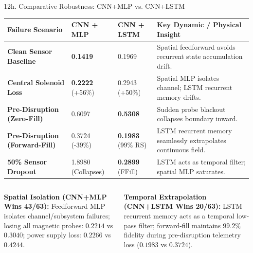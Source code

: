 \documentclass[aspectratio=169, 10pt]{beamer}
\begin{document}
\begin{frame}{12h. Comparative Robustness: CNN+MLP vs. CNN+LSTM}
  \vspace{-4pt}
  \begin{table}[h]
    \centering
    \footnotesize
    \renewcommand{\arraystretch}{1.2}
    \begin{tabular}{P{3.5cm} C{2.1cm} C{2.1cm} P{4.8cm}}
      \toprule
      \textbf{Failure Scenario} & \textbf{CNN + MLP} & \textbf{CNN + LSTM} & \textbf{Key Dynamic / Physical Insight} \\
      \midrule
      \textbf{Clean Sensor Baseline} & \textbf{0.1419} & 0.1969 & Spatial feedforward avoids recurrent state accumulation drift. \\
      \addlinespace[2pt]
      \textbf{Central Solenoid Loss} & \textbf{0.2222} (+56\%) & 0.2943 (+50\%) & Spatial MLP isolates channel; LSTM recurrent memory drifts. \\
      \addlinespace[2pt]
      \textbf{Pre-Disruption (Zero-Fill)} & 0.6097 & \textbf{0.5308} & Sudden probe blackout collapses boundary inward. \\
      \addlinespace[2pt]
      \textbf{Pre-Disruption (Forward-Fill)} & 0.3724 (-39\%) & \textbf{0.1983} (99\% RS) & LSTM recurrent memory seamlessly extrapolates continuous field. \\
      \addlinespace[2pt]
      \textbf{50\% Sensor Dropout} & 1.8980 (Collapses) & \textbf{0.2899} (FFill) & LSTM acts as temporal filter; spatial MLP saturates. \\
      \bottomrule
    \end{tabular}
  \end{table}

  \vspace{4pt}
  \begin{columns}[T]
    \begin{column}{0.48\textwidth}
      \footnotesize
      \textbf{\color{NavyBlue} Spatial Isolation (CNN+MLP Wins 43/63):}
      Feedforward MLP isolates channel/subsystem failures; losing all magnetic probes: $\mathbf{0.2214}$ vs $0.3040$; power supply loss: $\mathbf{0.2266}$ vs $0.4244$.
    \end{column}
    \begin{column}{0.48\textwidth}
      \footnotesize
      \textbf{\color{NavyBlue} Temporal Extrapolation (CNN+LSTM Wins 20/63):}
      LSTM recurrent memory acts as a temporal low-pass filter; forward-fill maintains $99.2\%$ fidelity during pre-disruption telemetry loss ($0.1983$ vs $0.3724$).
    \end{column}
  \end{columns}
\end{frame}
\end{document}
